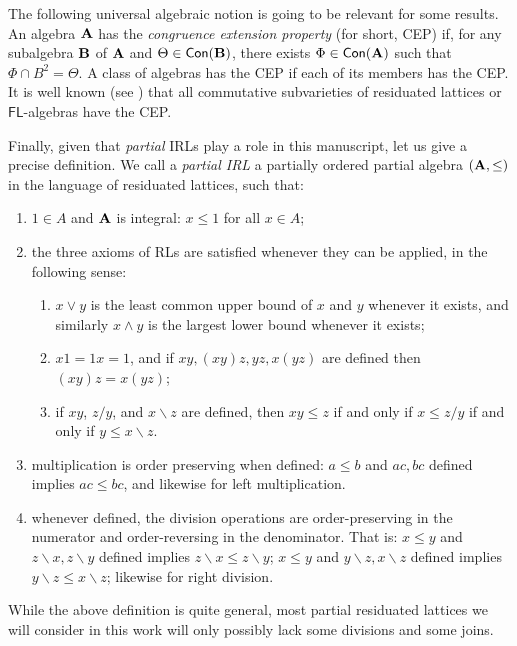 \documentclass{amsart}
\theoremstyle{definition}
\numberwithin{equation}{section}
\newcommand{\alg}[1]{{\textbf{\upshape #1}}}  %
\newcommand{\back}{\backslash}
\begin{document}
 The following universal algebraic notion is going to be relevant for some results. An algebra $\alg A$ has the {\em congruence extension property} (for short, CEP) if, for any subalgebra $\alg B$ of $\alg A$ and $\Theta \in \mathsf{Con}(\alg B)$, there exists $\Phi \in  \mathsf{Con}(\alg A)$ such that $\Phi \cap B^2 = \Theta$. A class of algebras has the CEP if each of its members has the CEP. It is well known (see \cite{GJKO,MPT2023}) that all commutative subvarieties of residuated lattices or $\mathsf{FL}$-algebras have the CEP. 
	
	
	Finally, given that {\em partial} IRLs play a role in this manuscript, let us give a precise definition. 
	We call a \emph{partial IRL} a partially ordered partial algebra $(\alg A, \leq)$ in the language of residuated lattices, such that:
	\begin{enumerate}
	\item $1 \in A$ and $\alg A$ is integral: $x \leq 1$ for all $x \in A$;
		\item the three axioms of RLs are satisfied whenever they can be applied, in the following sense: \begin{enumerate}
		\item $x \lor y$ is the least common upper bound of $x$ and $y$ whenever it exists, and similarly $x \land y$ is the largest lower bound whenever it exists;
		\item $x 1 = 1 x = 1$, and if $xy, (xy)z, yz, x(yz)$ are defined then $(xy)z = x(yz)$;
		\item if $xy$, $z / y$, and $x \back z$ are defined, then $xy \leq z$ if and only if $x \leq z / y$ if and only if $y \leq x \back z$.
		\end{enumerate}
		\item multiplication is order preserving when defined:  $a \leq b$ and $ac, bc$ defined implies $ac \leq bc$, and likewise for left multiplication.
		\item whenever defined, the division operations are order-preserving in the numerator and order-reversing in the denominator. That is:
		$x \leq y $ and $z \backslash x, z \backslash y$ defined implies $z \backslash x \leq z \backslash y$; $x \leq y $ and $ y \backslash z, x \backslash z$ defined implies $ y \backslash z \leq x \backslash z$; likewise for right division. 
	\end{enumerate}
	While the above definition is quite general, most partial residuated lattices we will consider in this work will only possibly lack some divisions and some joins.
\end{document}
